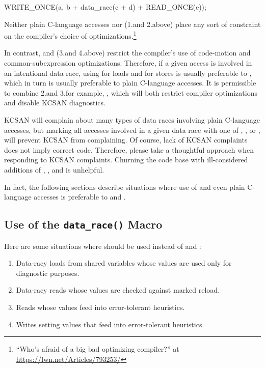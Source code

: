 \begin{VerbatimU}
	WRITE_ONCE(a, b + data_race(c + d) + READ_ONCE(e));
\end{VerbatimU}

Neither plain C-language accesses nor  (1.\@ and 2.\@ above) place
any sort of constraint on the compiler's choice of optimizations.\footnote{
``Who's afraid of a big bad optimizing compiler?'' at
\url{https://lwn.net/Articles/793253/}
}

In contrast,  and  (3.\@ and 4.\@ above) restrict the
compiler's use of code-motion and common-subexpression optimizations.
Therefore, if a given access is involved in an intentional data race,
using  for loads and  for stores is usually
preferable to , which in turn is usually preferable to plain
C-language accesses.
It is permissible to combine 2.\@ and 3.\@ for example,
, which will both restrict compiler optimizations
and disable KCSAN diagnostics.

KCSAN will complain about many types of data races involving plain
C-language accesses, but marking all accesses involved in a given data
race with one of , , or ,
will prevent KCSAN from complaining.
Of course, lack of KCSAN complaints does not imply correct code.
Therefore, please take a thoughtful approach when responding to KCSAN
complaints.
Churning the code base with ill-considered additions of ,
, and  is unhelpful.

In fact, the following sections describe situations where use of
 and even plain C-language accesses is preferable to
 and .


\subsection{Use of the \texttt{data\_race()} Macro}

Here are some situations where  should be used instead of
 and :

\begin{enumerate}
\item	Data-racy loads from shared variables whose values are used only
	for diagnostic purposes.

\item	Data-racy reads whose values are checked against marked reload.

\item	Reads whose values feed into error-tolerant heuristics.

\item	Writes setting values that feed into error-tolerant heuristics.
\end{enumerate}

